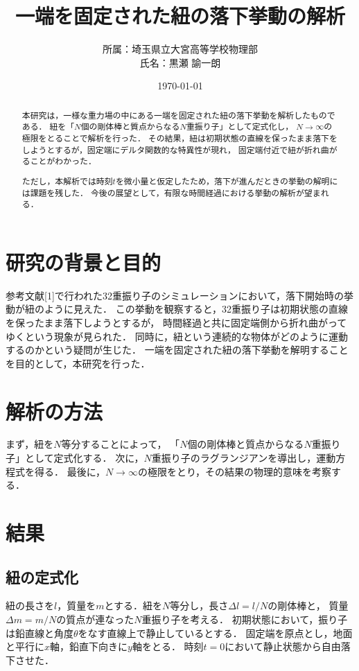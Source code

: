 \documentclass[paper=a4,fontsize=11pt,lualatex]{jlreq}
\title{一端を固定された紐の落下挙動の解析}
\author{所属：埼玉県立大宮高等学校物理部 \\ 氏名：黒瀬 諭一朗}
\date{\today}
\begin{document}
\maketitle

\begin{abstract}
本研究は，一様な重力場の中にある一端を固定された紐の落下挙動を解析したものである．
紐を「$N$個の剛体棒と質点からなる$N$重振り子」として定式化し，
$N\rightarrow\infty$の極限をとることで解析を行った．
その結果，紐は初期状態の直線を保ったまま落下をしようとするが，固定端にデルタ関数的な特異性が現れ，
固定端付近で紐が折れ曲がることがわかった．

ただし，本解析では時刻$t$を微小量と仮定したため，落下が進んだときの挙動の解明には課題を残した．
今後の展望として，有限な時間経過における挙動の解析が望まれる．
\end{abstract}

\section{研究の背景と目的}
参考文献[1]で行われた32重振り子のシミュレーションにおいて，落下開始時の挙動が紐のように見えた．
この挙動を観察すると，32重振り子は初期状態の直線を保ったまま落下しようとするが，
時間経過と共に固定端側から折れ曲がってゆくという現象が見られた．
同時に，紐という連続的な物体がどのように運動するのかという疑問が生じた．
一端を固定された紐の落下挙動を解明することを目的として，本研究を行った．

\section{解析の方法}
まず，紐を$N$等分することによって，
「$N$個の剛体棒と質点からなる$N$重振り子」として定式化する．
次に，$N$重振り子のラグランジアンを導出し，運動方程式を得る．
最後に，$N\rightarrow\infty$の極限をとり，その結果の物理的意味を考察する．

\section{結果}
\subsection{紐の定式化}
紐の長さを$l$，質量を$m$とする．紐を$N$等分し，長さ$\varDelta l = l/N$の剛体棒と，
質量$\varDelta m = m/N$の質点が連なった$N$重振り子を考える．
初期状態において，振り子は鉛直線と角度$\theta$をなす直線上で静止しているとする．
固定端を原点とし，地面と平行に$x$軸，鉛直下向きに$y$軸をとる．
時刻$t = 0$において静止状態から自由落下させた．
\end{document}
